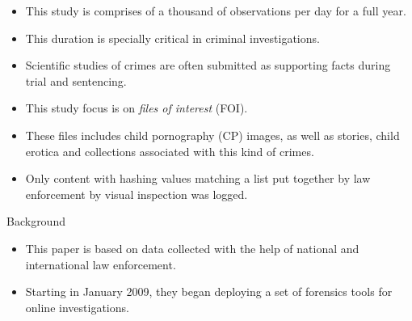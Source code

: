 \documentclass[notes]{beamer}
\begin{document}
\begin{frame}

\begin{itemize}

\item[\checkmark] This study is comprises of a thousand of observations per day for a full year.

\item[\checkmark] This duration is specially critical in criminal investigations.

\item[\checkmark] Scientific studies of crimes are often submitted as supporting facts during trial and sentencing.

\end{itemize}

\end{frame}

\begin{frame}

\begin{itemize}


\item[\checkmark] This study focus is on \textit{files of interest} (FOI).

\item[\checkmark] These files includes child pornography (CP) images, as well as stories, child erotica and collections associated with this kind of crimes.

\item[\checkmark] Only content with hashing values matching a list put together by law enforcement by visual inspection was logged.

\end{itemize}

\end{frame}

\begin{frame}
\begin{block}{Background}

\begin{itemize}

\item[\checkmark]This paper is based on data collected with the help of national and international law enforcement.

\item[\checkmark]Starting in January 2009, they began deploying a set of forensics tools for online investigations.

\end{itemize}

\end{block}

\end{frame}
\end{document}
